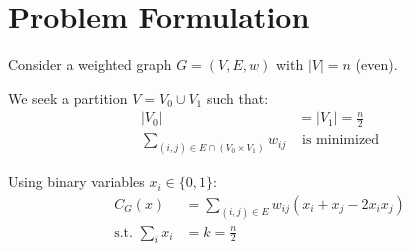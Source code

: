 \documentclass{article}
\begin{document}
\section{Problem Formulation}

Consider a weighted graph $G = (V, E, w)$ with $|V| = n$ (even).

We seek a partition $V = V_0 \cup V_1$ such that:
\begin{align}
    |V_0| &= |V_1| = \frac{n}{2} \\
    \sum_{(i,j) \in E \cap (V_0 \times V_1)} w_{ij} &\text{ is minimized}
\end{align}

Using binary variables $x_i \in \{0, 1\}$:
\begin{align}
    C_G(x) &= \sum_{(i,j) \in E} w_{ij}(x_i + x_j - 2x_i x_j) \\
    \text{s.t. } \sum_i x_i &= k = \frac{n}{2}
\end{align}
\end{document}
